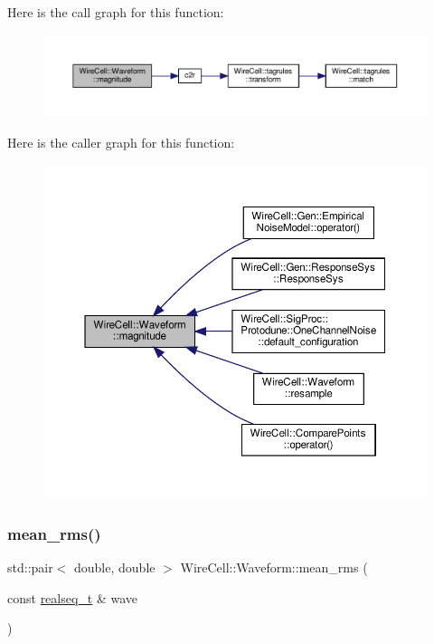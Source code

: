 Here is the call graph for this function\+:
\nopagebreak
\begin{figure}[H]
\begin{center}
\leavevmode
\includegraphics[width=350pt]{namespace_wire_cell_1_1_waveform_ae8dc1c86082f99f8cbfedb8434d22bc2_cgraph}
\end{center}
\end{figure}
Here is the caller graph for this function\+:
\nopagebreak
\begin{figure}[H]
\begin{center}
\leavevmode
\includegraphics[width=350pt]{namespace_wire_cell_1_1_waveform_ae8dc1c86082f99f8cbfedb8434d22bc2_icgraph}
\end{center}
\end{figure}
\mbox{\label{namespace_wire_cell_1_1_waveform_af0395e9b0e5e9e86a26579badb834092}} 
\subsubsection{\texorpdfstring{mean\+\_\+rms()}{mean\_rms()}}
{\footnotesize\ttfamily std\+::pair$<$ double, double $>$ Wire\+Cell\+::\+Waveform\+::mean\+\_\+rms (\begin{DoxyParamCaption}\item[{const \hyperlink{namespace_wire_cell_1_1_waveform_a479175e541c8545e87cd8063b74b6956}{realseq\+\_\+t} \&}]{wave }\end{DoxyParamCaption})}




